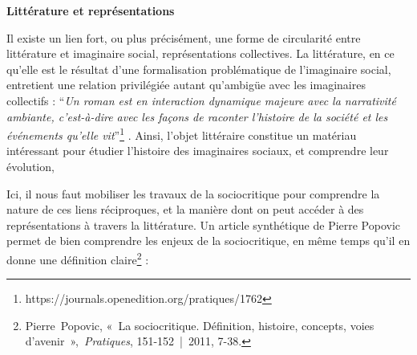 \documentclass[letterpaper,portrait,12pt]{article}
\begin{document}
\textbf{	}\textbf{Litt\'{e}rature et repr\'{e}sentations}





	Il existe un lien fort, ou plus pr\'{e}cis\'{e}ment, une forme de circularit\'{e} entre litt\'{e}rature et imaginaire social, repr\'{e}sentations collectives. La litt\'{e}rature, en ce qu'elle est le r\'{e}sultat d'une formalisation probl\'{e}matique de l'imaginaire social, entretient une relation privil\'{e}gi\'{e}e autant qu'ambig\"{u}e avec les imaginaires collectifs : {``}\emph{Un roman est en interaction dynamique majeure avec la narrativit\'{e} ambiante, c'est-\`{a}-dire avec les fa\c{c}ons de raconter l'histoire de la soci\'{e}t\'{e} et les \'{e}v\'{e}nements qu'elle vit}''\footnote{	https://journals.openedition.org/pratiques/1762} . Ainsi,   l'objet litt\'{e}raire constitue un mat\'{e}riau int\'{e}ressant pour \'{e}tudier l'histoire des imaginaires sociaux, et comprendre leur \'{e}volution,





	Ici, il nous faut mobiliser les travaux de la sociocritique pour comprendre la nature de ces liens r\'{e}ciproques, et la mani\`{e}re dont on peut acc\'{e}der \`{a} des repr\'{e}sentations \`{a} travers la litt\'{e}rature. Un article synth\'{e}tique de Pierre Popovic permet de bien comprendre les enjeux de la sociocritique, en m\^{e}me temps qu'il en donne une d\'{e}finition claire\footnote{	\textcolor[rgb]{0.000,0.200,0.200}{{\scriptsize Pierre Popovic}}\textcolor[rgb]{0.000,0.200,0.200}{{\scriptsize , « La sociocritique. D\'{e}finition, histoire, concepts, voies d'avenir », }}\emph{\textcolor[rgb]{0.000,0.200,0.200}{{\scriptsize Pratiques}}}\textcolor[rgb]{0.000,0.200,0.200}{{\scriptsize , 151-152 | 2011, 7-38.}}}  :
\end{document}
